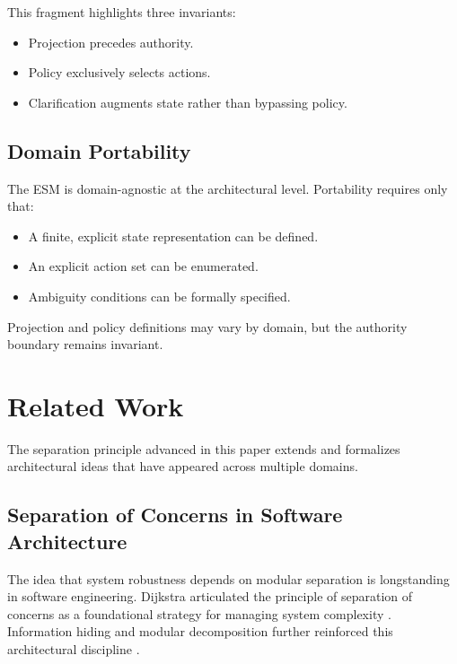 \documentclass[11pt]{article}
\begin{document}
This fragment highlights three invariants:

\begin{itemize}
  \item Projection precedes authority.
  \item Policy exclusively selects actions.
  \item Clarification augments state rather than bypassing policy.
\end{itemize}

\subsection{Domain Portability}

The ESM is domain-agnostic at the architectural level. Portability requires only that:

\begin{itemize}
  \item A finite, explicit state representation can be defined.
  \item An explicit action set can be enumerated.
  \item Ambiguity conditions can be formally specified.
\end{itemize}

Projection and policy definitions may vary by domain, but the authority boundary remains invariant.



\section{Related Work}

The separation principle advanced in this paper extends and formalizes architectural ideas that have appeared across multiple domains.

\subsection{Separation of Concerns in Software Architecture}

The idea that system robustness depends on modular separation is longstanding in software engineering. Dijkstra articulated the principle of separation of concerns as a foundational strategy for managing system complexity \citep{dijkstra1974}. Information hiding and modular decomposition further reinforced this architectural discipline \citep{parnas1972}.
\end{document}
